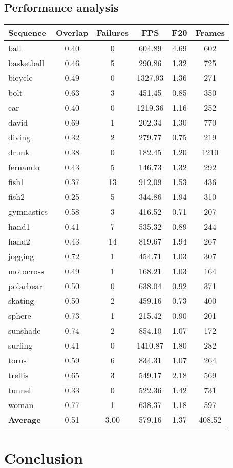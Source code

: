 \documentclass[runningheads]{llncs}
\begin{document}
\subsection{Performance analysis}

\begin{table}
    \begin{center}
    \begin{tabular}{l c c c c c}
    \hline 
    {\bf Sequence} & {\bf Overlap} & {\bf Failures} & {\bf FPS} & {\bf F20} & {\bf Frames} \\
    \hline 
    ball & 0.40 & 0 & 604.89 & 4.69 & 602 \\
    basketball & 0.46 & 5 & 290.86 & 1.32 & 725 \\
    bicycle & 0.49 & 0 & 1327.93 & 1.36 & 271 \\
    bolt & 0.63 & 3 & 451.45 & 0.85 & 350 \\
    car & 0.40 & 0 & 1219.36 & 1.16 & 252 \\
    david & 0.69 & 1 & 202.34 & 1.30 & 770 \\
    diving & 0.32 & 2 & 279.77 & 0.75 & 219 \\
    drunk & 0.38 & 0 & 182.45 & 1.20 & 1210 \\
    fernando & 0.43 & 5 & 146.73 & 1.32 & 292 \\
    fish1 & 0.37 & 13 & 912.09 & 1.53 & 436 \\
    fish2 & 0.25 & 5 & 344.86 & 1.94 & 310 \\
    gymnastics & 0.58 & 3 & 416.52 & 0.71 & 207 \\
    hand1 & 0.41 & 7 & 535.32 & 0.89 & 244 \\
    hand2 & 0.43 & 14 & 819.67 & 1.94 & 267 \\
    jogging & 0.72 & 1 & 454.71 & 1.03 & 307 \\
    motocross & 0.49 & 1 & 168.21 & 1.03 & 164 \\
    polarbear & 0.50 & 0 & 638.04 & 0.92 & 371 \\
    skating & 0.50 & 2 & 459.16 & 0.73 & 400 \\
    sphere & 0.73 & 1 & 215.42 & 0.90 & 201 \\
    sunshade & 0.74 & 2 & 854.10 & 1.07 & 172 \\
    surfing & 0.41 & 0 & 1410.87 & 1.80 & 282 \\
    torus & 0.59 & 6 & 834.31 & 1.07 & 264 \\
    trellis & 0.65 & 3 & 549.17 & 2.18 & 569 \\
    tunnel & 0.33 & 0 & 522.36 & 1.42 & 731 \\
    woman & 0.77 & 1 & 638.37 & 1.18 & 597 \\
    \hline 
    {\bf Average} & 0.51 & 3.00 & 579.16 & 1.37 & 408.52 \\
    \hline 
    \end{tabular}
    \end{center}
    \end{table}
    

\section{Conclusion}
\end{document}
